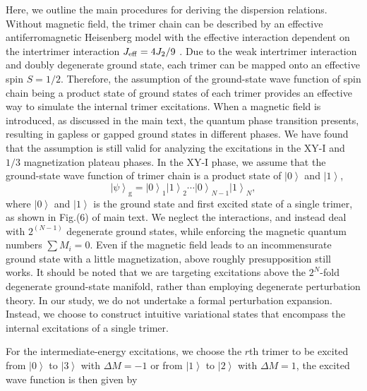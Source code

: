 \documentclass[aps,prx,showpacs,floatfix,twocolumn,superscriptaddress,nofootinbib,longbibliography]{revtex4-2}
\begin{document}
  Here, we outline the main  procedures for deriving the dispersion relations.  Without magnetic field, the trimer chain can be described by an effective antiferromagnetic Heisenberg model with the effective interaction dependent on the intertrimer  interaction $J_{\rm{eff}}=4J_2/9$ \cite{cheng2022}. Due to the weak intertrimer interaction and doubly degenerate ground state, each trimer can be mapped onto  an effective spin $S=1/2$. Therefore, the assumption of  the ground-state wave function of spin chain being a product state of ground states of each trimer provides an effective way to simulate the internal trimer excitations. When a magnetic field is introduced,  as discussed in the main text, the quantum phase transition presents, resulting in gapless or gapped ground states in different phases. We have found that the assumption is still valid for   analyzing the excitations in the XY-I and $1/3 $ magnetization  plateau phases. 
  In the XY-I phase, we assume that the ground-state wave function of trimer chain is a product state of  $\left|0\right\rangle$ and $\left|1\right\rangle$, 
  \begin{equation}
	  \label{ground state}
	  \left| {\psi}\right\rangle_{\mathrm{g}}=\left| {0}\right\rangle_1 \left| {1}\right\rangle_2 \cdots \left| {0}\right\rangle_{N-1}  \left| {1}\right\rangle_{N},
  \end{equation}
  where $\left|0\right\rangle$ and $\left|1\right\rangle$ is the ground state and first excited state of a single trimer, as shown in Fig.(6) of main text. We neglect the interactions,  and instead deal with $2^(N-1)$ degenerate ground states, while enforcing the magnetic quantum numbers $\sum M_i = 0 $. Even if the  magnetic field leads to  an incommensurate ground state with a little magnetization, above roughly presupposition still works. It should be noted that we are targeting excitations above the $2^N$-fold degenerate ground-state manifold, rather than employing degenerate  perturbation theory. In our study,  we do not undertake  a formal perturbation expansion. Instead, we choose to construct intuitive variational states that encompass the internal excitations of a single trimer. 
  
  For the intermediate-energy excitations, we choose the $r$th trimer to be excited from $\left|0\right\rangle$ to $\left|3\right\rangle$ with $\Delta M =-1$ or  from $\left|1\right\rangle$ to $\left|2\right\rangle$ with $\Delta M =1$,   the excited wave function is then given by 
  
\end{document}
